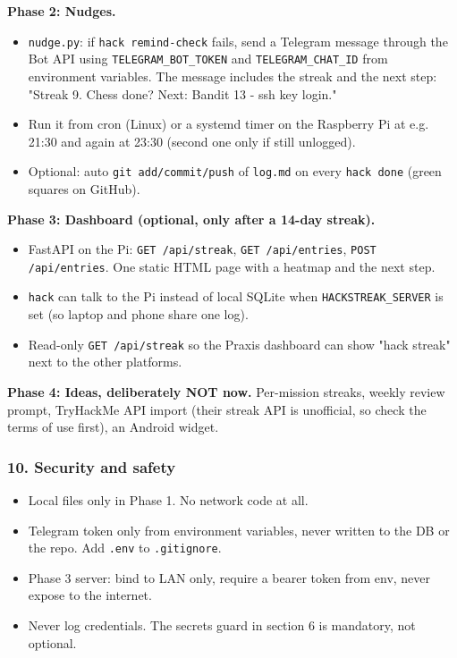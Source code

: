 \textbf{Phase 2: Nudges.}

\begin{itemize}
\tightlist
\item
  \texttt{nudge.py}: if \texttt{hack remind-check} fails, send a
  Telegram message through the Bot API using
  \texttt{TELEGRAM\_BOT\_TOKEN} and \texttt{TELEGRAM\_CHAT\_ID} from
  environment variables. The message includes the streak and the next
  step: "Streak 9. Chess done? Next: Bandit 13 - ssh key login."
\item
  Run it from cron (Linux) or a systemd timer on the Raspberry Pi at
  e.g. 21:30 and again at 23:30 (second one only if still unlogged).
\item
  Optional: auto \texttt{git add/commit/push} of \texttt{log.md} on
  every \texttt{hack done} (green squares on GitHub).
\end{itemize}

\textbf{Phase 3: Dashboard (optional, only after a 14-day streak).}

\begin{itemize}
\tightlist
\item
  FastAPI on the Pi: \texttt{GET /api/streak},
  \texttt{GET /api/entries}, \texttt{POST /api/entries}. One static
  HTML page with a heatmap and the next step.
\item
  \texttt{hack} can talk to the Pi instead of local SQLite when
  \texttt{HACKSTREAK\_SERVER} is set (so laptop and phone share one
  log).
\item
  Read-only \texttt{GET /api/streak} so the Praxis dashboard can show
  "hack streak" next to the other platforms.
\end{itemize}

\textbf{Phase 4: Ideas, deliberately NOT now.} Per-mission streaks,
weekly review prompt, TryHackMe API import (their streak API is
unofficial, so check the terms of use first), an Android widget.

\hypertarget{hackstreak-spec-10-security-and-safety}{%
\subsubsection{10. Security and safety}\label{hackstreak-spec-10-security-and-safety}}

\begin{itemize}
\tightlist
\item
  Local files only in Phase 1. No network code at all.
\item
  Telegram token only from environment variables, never written to the
  DB or the repo. Add \texttt{.env} to \texttt{.gitignore}.
\item
  Phase 3 server: bind to LAN only, require a bearer token from env,
  never expose to the internet.
\item
  Never log credentials. The secrets guard in section 6 is mandatory,
  not optional.
\end{itemize}


